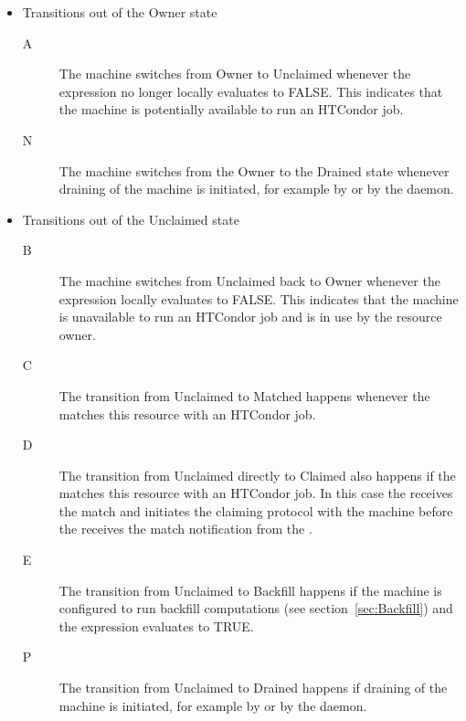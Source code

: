 \begin{itemize}


\item Transitions out of the Owner state

\begin{description}

\item[A] The machine switches from Owner to Unclaimed whenever the
   expression no longer locally evaluates to FALSE.
  This indicates that the machine is potentially available to run an
  HTCondor job.

\item[N] The machine switches from the Owner to the Drained state
  whenever draining of the machine is initiated,
  for example by  or by the  daemon.

\end{description}


\item Transitions out of the Unclaimed state

\begin{description}

\item[B] The machine switches from Unclaimed back to Owner whenever the
   expression locally evaluates to FALSE.
  This indicates that the machine is unavailable to run an HTCondor job
  and is in use by the resource owner.

\item[C] The transition from Unclaimed to Matched happens whenever the
   matches this resource with an HTCondor job.

\item[D] The transition from Unclaimed directly to Claimed also happens
  if the  matches this resource with an HTCondor job.
  In this case the  receives the match and initiates
  the claiming protocol with the machine before the 
  receives the match notification from the .

\item[E] The transition from Unclaimed to Backfill happens if the
  machine is configured to run backfill computations (see
  section~\ref{sec:Backfill}) and the 
  expression evaluates to TRUE.

\item[P] The transition from Unclaimed to Drained happens
  if draining of the machine is initiated,
  for example by  or by the  daemon.


\end{description}
\end{itemize}
